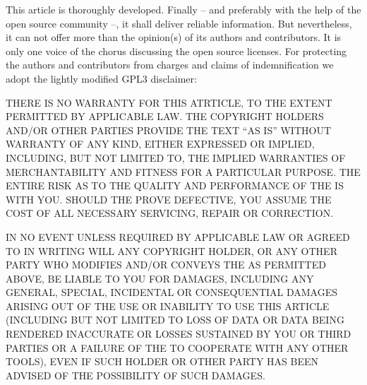 %
%
%
%

%


This article is thoroughly developed. Finally -- and preferably with the help
of the open source community --, it shall deliver reliable information. But
nevertheless, it can not offer more than the opinion(s) of its authors and
contributors. It is only one voice of the chorus discussing the open source
licenses. For protecting the authors and contributors from charges and claims of
indemnification we adopt the lightly modified GPL3 disclaimer:

{ \newcommand\gummi{\hspace{0pt plus 1pc}} THERE IS NO WARRANTY FOR THIS
ATRTICLE, TO THE EXTENT PERMITTED BY APPLICABLE LAW. THE COPYRIGHT HOLDERS
AND/OR OTHER PARTIES PROVIDE THE TEXT “AS IS” WITHOUT WARRANTY OF ANY KIND,
EITHER EXPRESSED OR IMPLIED, INCLUDING, BUT NOT LIMITED TO, THE IMPLIED
WARRANTIES OF MERCHANTABILITY AND FITNESS FOR A PARTICULAR PURPOSE. THE ENTIRE
RISK AS TO THE QUALITY AND PERFORMANCE OF THE \oslic{} IS WITH YOU. \gummi
SHOULD THE \oslic{} PROVE DEFECTIVE, \gummi YOU ASSUME THE COST OF ALL NECESSARY
SERVICING, REPAIR OR CORRECTION.

IN NO EVENT \gummi UNLESS REQUIRED BY APPLICABLE LAW \gummi OR AGREED TO IN
WRITING WILL ANY COPYRIGHT HOLDER, OR ANY OTHER PARTY WHO MODIFIES AND/OR
CONVEYS THE \oslic{} AS PERMITTED ABOVE, BE LIABLE TO YOU FOR DAMAGES, INCLUDING
ANY GENERAL, \gummi SPECIAL, \gummi INCIDENTAL \gummi OR CONSEQUENTIAL DAMAGES
ARISING OUT OF THE USE OR INABILITY TO USE THIS ARTICLE (INCLUDING BUT NOT
LIMITED TO LOSS OF DATA OR DATA BEING RENDERED INACCURATE OR LOSSES SUSTAINED BY
YOU OR THIRD PARTIES OR A FAILURE OF THE \oslic{} TO COOPERATE WITH ANY OTHER
TOOLS), EVEN IF SUCH HOLDER OR OTHER PARTY HAS BEEN ADVISED OF THE POSSIBILITY
OF SUCH DAMAGES.
}

